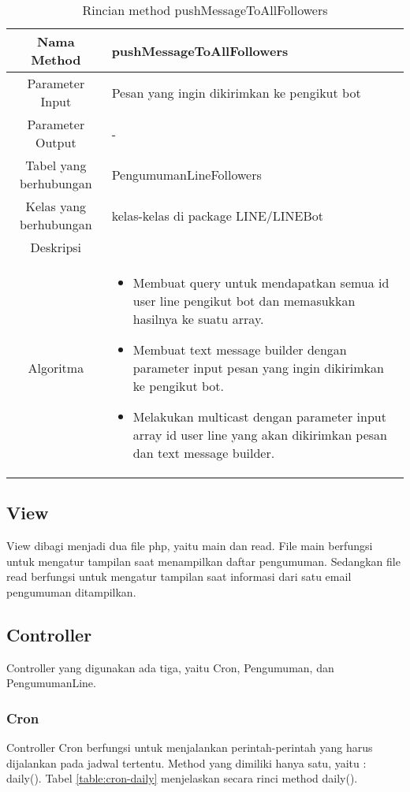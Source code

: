 \begin{center}
	\begin{table}[H]
	\caption{Rincian method pushMessageToAllFollowers}
	\label{table:pengumuman-line-model-pushmessagetoallfollowers}
\begin{tabular}{|c|p{11cm}|}
\hline
Nama Method 	& 	 pushMessageToAllFollowers	\\
\hline
Parameter Input & Pesan yang ingin dikirimkan ke pengikut bot \\
\hline
Parameter Output & - \\
\hline
Tabel yang berhubungan & PengumumanLineFollowers \\
\hline
Kelas yang berhubungan & kelas-kelas di package LINE/LINEBot \\
\hline
Deskripsi	& \\
\hline
Algoritma	& \begin{itemize}
				\item Membuat query untuk mendapatkan semua id user line pengikut bot dan memasukkan hasilnya ke suatu array.
				\item Membuat text message builder dengan parameter input pesan yang ingin dikirimkan ke pengikut bot.
				\item Melakukan multicast dengan parameter input array id user line yang akan dikirimkan pesan dan text message builder.
				\end{itemize} \\
\hline
\end{tabular}
\end{table}
\end{center}

\subsection{View}
View dibagi menjadi dua file php, yaitu main dan read. File main berfungsi untuk mengatur tampilan saat menampilkan daftar pengumuman. Sedangkan file read berfungsi untuk mengatur tampilan saat informasi dari satu email pengumuman ditampilkan.

\subsection{Controller}
Controller yang digunakan ada tiga, yaitu Cron, Pengumuman, dan PengumumanLine.
\subsubsection{Cron}
Controller Cron berfungsi untuk menjalankan perintah-perintah yang harus dijalankan pada jadwal tertentu. Method yang dimiliki hanya satu, yaitu : daily(). Tabel \ref{table:cron-daily} menjelaskan secara rinci method daily().

